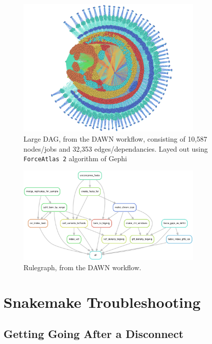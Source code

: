 \begin{figure}[H]
\centering
\includegraphics[width=0.8\textwidth]{handout/DAWN_DAG.png}
\caption{Large DAG, from the DAWN workflow, consisting of 10,587 nodes/jobs and 32,353 edges/dependancies. Layed out using \texttt{ForceAtlas 2} algorithm of Gephi}
\label{fig:dawn_dag}
\end{figure}

\begin{figure}[H]
\centering
\includegraphics[width=0.8\textwidth]{handout/DAWN_rulegraph.pdf}
\caption{Rulegraph, from the DAWN workflow.}
\label{fig:dawn_rulegraph}
\end{figure}


%
%
%


\newpage
\section{Snakemake Troubleshooting}
\label{sec:snake_trouble}

\subsection{Getting Going After a Disconnect}

